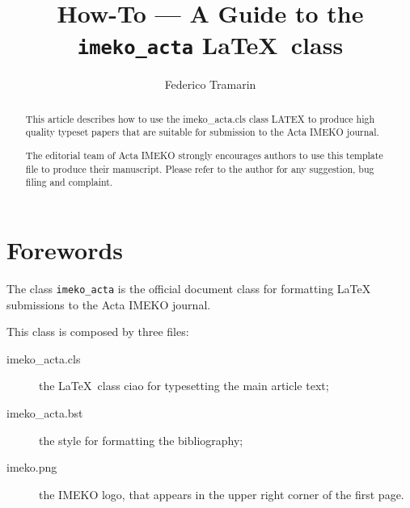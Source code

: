 \documentclass[11pt,onecolumn,notitlepage]{article}
\def\file#1{\textsf{\fontsize{9.2}{9.5}\selectfont\color{MidnightBlue}#1}\xspace}
\begin{document}
\title{How-To --- A Guide to the \texttt{imeko\_acta} \LaTeX\ class} %

\author{Federico Tramarin}%




\maketitle

\begin{abstract}
	This article describes how to use the imeko\_acta.cls class LATEX to produce high quality typeset papers that are suitable for submission to the Acta IMEKO journal.
	
	The editorial team of Acta IMEKO strongly encourages 
	authors to use this \LaTeXe template file to produce their manuscript.
	Please refer to the author for any suggestion, bug filing and complaint.
\end{abstract}

\section{Forewords}

The class {\tt imeko\_acta} is the official document class for formatting \LaTeX{} submissions to the Acta IMEKO journal.
\medskip

This class is composed by three files:
\begin{description}

	\item [\file{imeko\_acta.cls}]  the \LaTeX\ class \file{ciao} for typesetting the main article text;
	
	
	\item [\file{imeko\_acta.bst}]  the style for formatting the bibliography;
	
	\item [\file{imeko.png}] the IMEKO logo, that appears in the upper right corner of the first page.
\end{description}
\end{document}
